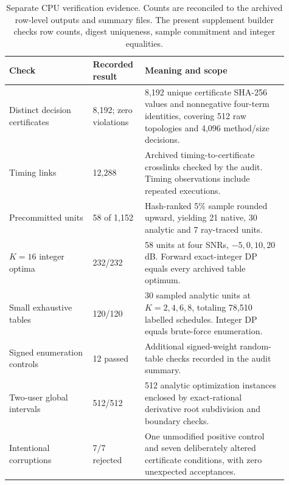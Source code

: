 \documentclass[10pt,letterpaper]{article}
\begin{document}
\begin{table}[htbp]
\centering\small
\caption{Separate CPU verification evidence. Counts are reconciled to the archived
row-level outputs and summary files. The present supplement builder checks
row counts, digest uniqueness, sample commitment and integer equalities.}
\label{supp:table10}
\begin{tabular}{p{0.28\linewidth}p{0.15\linewidth}p{0.48\linewidth}}
\hline
Check & Recorded result & Meaning and scope\\
\hline
Distinct decision certificates &8,192; zero violations&8,192 unique certificate SHA-256 values and nonnegative four-term identities, covering 512 raw topologies and 4,096 method/size decisions.\\
Timing links &12,288&Archived timing-to-certificate crosslinks checked by the audit. Timing observations include repeated executions.\\
Precommitted units &58 of 1,152&Hash-ranked 5\% sample rounded upward, yielding 21 native, 30 analytic and 7 ray-traced units.\\
$K=16$ integer optima &232/232&58 units at four SNRs, $-5,0,10,20$ dB. Forward exact-integer DP equals every archived table optimum.\\
Small exhaustive tables &120/120&30 sampled analytic units at $K=2,4,6,8$, totaling 78,510 labelled schedules. Integer DP equals brute-force enumeration.\\
Signed enumeration controls &12 passed&Additional signed-weight random-table checks recorded in the audit summary.\\
Two-user global intervals &512/512&512 analytic optimization instances enclosed by exact-rational derivative root subdivision and boundary checks.\\
Intentional corruptions &7/7 rejected&One unmodified positive control and seven deliberately altered certificate conditions, with zero unexpected acceptances.\\
\hline
\end{tabular}
\end{table}
\end{document}
